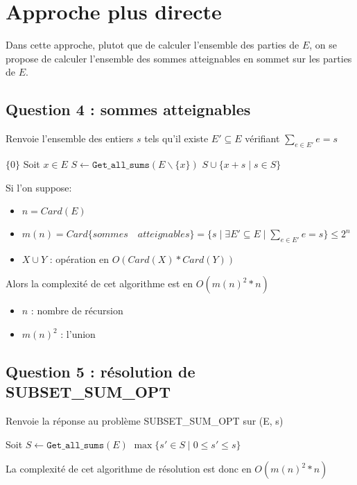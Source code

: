 \documentclass[10pt]{article}
\let\oldReturn\Return
\renewcommand{\Return}{\State\oldReturn}
\begin{document}
		\section{Approche plus directe}\label{approche_plus_directe}
			Dans cette approche, plutot que de calculer l'ensemble des parties de $E$,
			on se propose de calculer l'ensemble des sommes atteignables en sommet sur les parties de $E$.
			
			\subsection{Question 4 : sommes atteignables}
				\begin{algorithm}
					\caption{Renvoie l'ensemble des entiers $s$ tels qu'il existe $E' \subseteq E$ vérifiant $\sum\limits_{e \in E'}e = s$}
					\begin{algorithmic}[1]
								\Return $\{0\}$
							\EndIf
							\State Soit $x \in E$
							\State $S \leftarrow \mathtt{Get\_all\_sums}(E \backslash \{x\})$
							\Return $S \cup \{x + s \mid s \in S\}$
						\EndFunction
					\end{algorithmic}
				\end{algorithm}
				Si l'on suppose:
				\begin{itemize}[label=-]
					\setlength\itemsep{0.1em}
					\item $n = Card(E)$
					\item $m(n) = Card\{sommes \quad atteignables\} = \{s \mid \exists E' \subseteq E \mid \sum\limits_{e \in E'}e = s\} \leq 2^n$
					\item $X \cup Y$ : opération en $O(Card(X) * Card(Y))$
				\end{itemize}
				Alors la complexité de cet algorithme est en $\boxed{O(m(n)^2 * n)}$
				\begin{itemize}[label=-]
					\setlength\itemsep{0.1em}
					\item $n$ : nombre de récursion
					\item $m(n)^2$ : l'union
				\end{itemize}

			\subsection{Question 5 : résolution de SUBSET\_SUM\_OPT}
				\begin{algorithm}
					\caption{Renvoie la réponse au problème SUBSET\_SUM\_OPT sur (E, s)}
					\begin{algorithmic}[1]
						\Function{subset\_sum}{$E \subset \mathbb{N}, s \in \mathbb{N}$}
							\State Soit $S \leftarrow \mathtt{Get\_all\_sums}(E)$
							\Return $\max\{s' \in S \mid 0 \leq s' \leq s\}$
						\EndFunction
					\end{algorithmic}
				\end{algorithm}
				La complexité de cet algorithme de résolution est donc en $\boxed{O(m(n)^2 * n)}$
\end{document}
